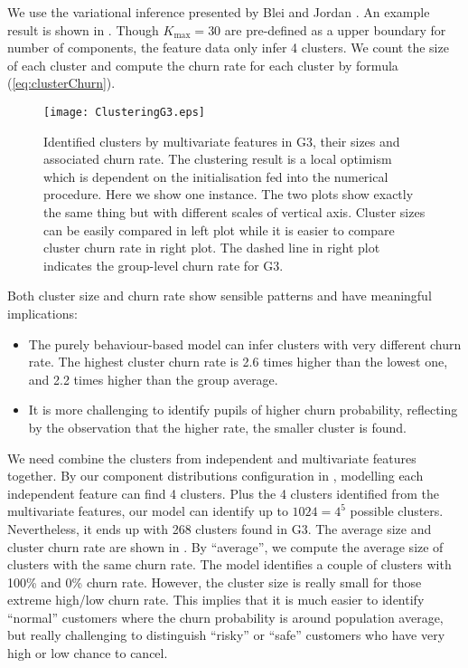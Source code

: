 We use the variational inference presented by Blei and Jordan \cite{blei2006}. An example result is shown in . Though $K_\text{max}=30$ are pre-defined as a upper boundary for number of components, the feature data only infer 4 clusters. We count the size of each cluster and compute the churn rate for each cluster by formula (\ref{eq:clusterChurn}).

\begin{figure}[!h]
\centering
\texttt{[image: ClusteringG3.eps]}
\caption{Identified clusters by multivariate features in G3, their sizes and associated churn rate. The clustering result is a local optimism which is dependent on the initialisation fed into the numerical procedure. Here we show one instance. The two plots show exactly the same thing but with different scales of vertical axis. Cluster sizes can be easily compared in left plot while it is easier to compare cluster churn rate in right plot. The dashed line in right plot indicates the group-level churn rate for G3.}
\label{fig:clusteringG3}
\end{figure}

Both cluster size and churn rate show sensible patterns and have meaningful implications:
\begin{itemize}
\item The purely behaviour-based model can infer clusters with very different churn rate. The highest cluster churn rate is 2.6 times higher than the lowest one, and 2.2 times higher than the group average.
\item It is more challenging to identify pupils of higher churn probability, reflecting by the observation that the higher rate, the smaller cluster is found.
\end{itemize} 

We need combine the clusters from independent and multivariate features together. By our component distributions configuration in , modelling each independent feature can find 4 clusters. Plus the 4 clusters identified from the multivariate features, our model can identify up to $1024 = 4^5$ possible clusters. Nevertheless, it ends up with 268 clusters found in G3. The average size and cluster churn rate are shown in . By ``average'', we compute the average size of clusters with the same churn rate. The model identifies a couple of clusters with 100\% and 0\% churn rate. However, the cluster size is really small for those extreme high/low churn rate. This implies that it is much easier to identify ``normal'' customers where the churn probability is around population average, but really challenging to distinguish ``risky'' or ``safe'' customers who have very high or low chance to cancel.

